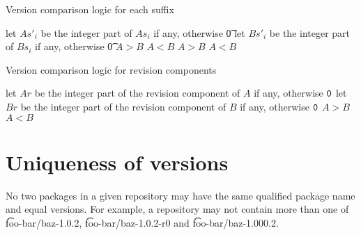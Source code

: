 \begin{algorithm}
\caption{Version comparison logic for each suffix} \label{alg:version-comparison-suffix-each}
\begin{algorithmic}[1]
    \STATE let $As'_i$ be the integer part of $As_i$ if any, otherwise \t{0}
    \STATE let $Bs'_i$ be the integer part of $Bs_i$ if any, otherwise \t{0}
      \RETURN $A>B$
      \RETURN $A<B$
    \ENDIF
    \RETURN $A>B$
  \ELSE
    \RETURN $A<B$
  \ENDIF
\end{algorithmic}
\end{algorithm}

\begin{algorithm}
\caption{Version comparison logic for revision components} \label{alg:version-comparison-revision}
\begin{algorithmic}[1]
  \STATE let $Ar$ be the integer part of the revision component of $A$ if any, otherwise $\texttt{0}$
  \STATE let $Br$ be the integer part of the revision component of $B$ if any, otherwise $\texttt{0}$
    \RETURN $A>B$
    \RETURN $A<B$
  \ENDIF
\end{algorithmic}
\end{algorithm}

\section{Uniqueness of versions}

No two packages in a given repository may have the same qualified package name and equal versions.
For example, a repository may not contain more than one of \t{foo-bar/baz-1.0.2},
\t{foo-bar/baz-1.0.2-r0} and \t{foo-bar/baz-1.000.2}.


